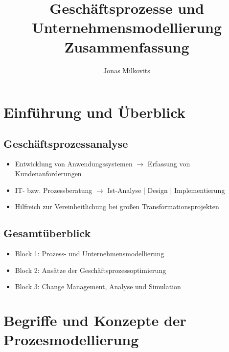 \documentclass[11pt,a4paper]{article}
\title{Geschäftsprozesse und Unternehmensmodellierung Zusammenfassung}
\author{Jonas Milkovits}
\begin{document}
\maketitle
\tableofcontents
\pagebreak
 
\section{Einführung und Überblick} %
\subsection{Geschäftsprozessanalyse}

\begin{itemize}
\item Entwicklung von Anwendungssystemen $\rightarrow$ Erfassung von Kundenanforderungen
\item IT- bzw. Prozessberatung $\rightarrow$ Ist-Analyse | Design | Implementierung 
\item Hilfreich zur Vereinheitlichung bei großen Transformationsprojekten
\end{itemize}

\subsection{Gesamtüberblick}

\begin{itemize}
\item Block 1: Prozess- und Unternehmensmodellierung
\item Block 2: Ansätze der Geschäftsprozessoptimierung
\item Block 3: Change Management, Analyse und Simulation
\end{itemize}

\section{Begriffe und Konzepte der Prozesmodellierung} %
\end{document}
